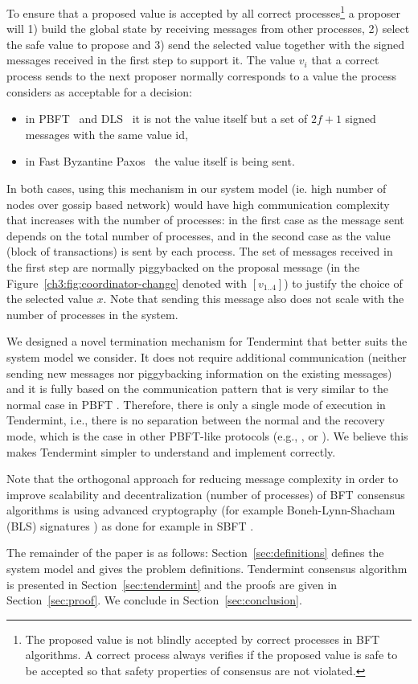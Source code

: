 To ensure that a proposed value is accepted by all correct
processes\footnote{The proposed value is not blindly accepted by correct
	processes in BFT algorithms. A correct process always verifies if the proposed
	value is safe to be accepted so that safety properties of consensus are not
	violated.}
a proposer will 1) build the global state by receiving messages from other
processes, 2) select the safe value to propose and 3) send the selected value
together with the signed messages
received in the first step to support it. The
value $v_i$ that a correct process sends to the next proposer normally
corresponds to a value the process considers as acceptable for a decision: 

\begin{itemize} \item in PBFT~\cite{CL99:osdi} and DLS~\cite{DLS88:jacm} it is
	not the value itself but a set of $2f+1$ signed messages with the same
	value id, \item in Fast Byzantine Paxos~\cite{MA06:tdsc} the value
	itself is being sent.  \end{itemize}

In both cases, using this mechanism in our system model (ie. high
number of nodes over gossip based network) would have high communication
complexity that increases with the number of processes: in the first case as
the message sent depends on the total number of processes, and in the second
case as the value (block of transactions) is sent by each process. The set of
messages received in the first step are normally piggybacked on the proposal
message (in the Figure~\ref{ch3:fig:coordinator-change} denoted with
$[v_{1..4}]$) to justify the choice of the selected value $x$. Note that
sending this message also does not scale with the number of processes in the
system.   

We designed a novel termination mechanism for Tendermint that better suits the
system model we consider. It does not require additional communication (neither
sending new messages nor piggybacking information on the existing messages) and
it is fully based on the communication pattern that is very similar to the
normal case in PBFT \cite{CL99:osdi}. Therefore, there is only a single mode of
execution in Tendermint, i.e., there is no separation between the normal and
the recovery mode, which is the case in other PBFT-like protocols (e.g.,
\cite{CL99:osdi}, \cite{Ver09:spinning} or \cite{Cle09:aardvark}). We believe
this makes Tendermint simpler to understand and implement correctly. 

Note that the orthogonal approach for reducing message complexity in order to
improve
scalability and decentralization (number of processes) of BFT consensus
algorithms is using advanced cryptography (for example Boneh-Lynn-Shacham (BLS)
signatures \cite{BLS2001:crypto}) as done for example in SBFT
\cite{Gue2018:sbft}.  

The remainder of the paper is as follows: Section~\ref{sec:definitions} defines
the system model and gives the problem definitions. Tendermint
consensus algorithm is presented in Section~\ref{sec:tendermint} and the
proofs are given in Section~\ref{sec:proof}. We conclude in
Section~\ref{sec:conclusion}.  




